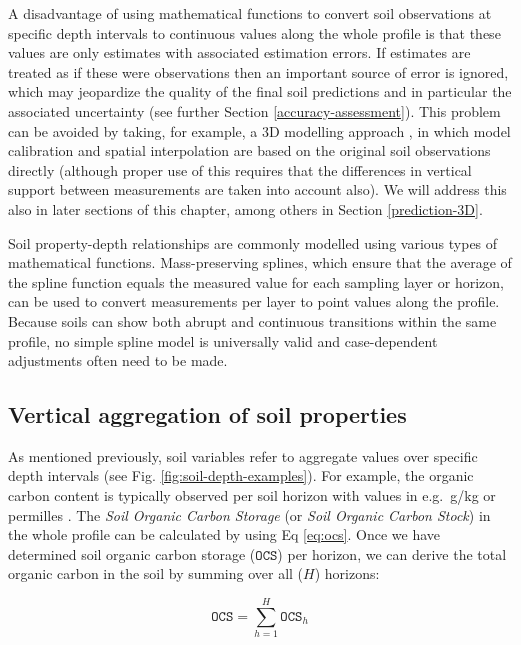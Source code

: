 \documentclass[graybox,natbib,nospthms,UStrade]{svmono}
\let\BeginKnitrBlock\begin \let\EndKnitrBlock\end
\let\BeginKnitrBlock\begin \let\EndKnitrBlock\end
\begin{document}
A disadvantage of using mathematical functions to convert soil
observations at specific depth intervals to continuous values along the
whole profile is that these values are only estimates with associated
estimation errors. If estimates are treated as if these were
observations then an important source of error is ignored, which may
jeopardize the quality of the final soil predictions and in particular
the associated uncertainty (see further
Section \ref{accuracy-assessment}). This problem can be avoided
by taking, for example, a 3D modelling approach
\citep{poggio2014national, Hengl2015AfSoilGrids250m}, in which model
calibration and spatial interpolation are based on the original soil
observations directly (although proper use of this requires that the
differences in vertical support between measurements are taken into
account also). We will address this also in later sections of this
chapter, among others in Section \ref{prediction-3D}.

\BeginKnitrBlock{rmdnote}
Soil property-depth relationships are commonly modelled using various
types of mathematical functions. Mass-preserving splines, which ensure
that the average of the spline function equals the measured value for
each sampling layer or horizon, can be used to convert measurements per
layer to point values along the profile. Because soils can show both
abrupt and continuous transitions within the same profile, no simple
spline model is universally valid and case-dependent adjustments often
need to be made.
\EndKnitrBlock{rmdnote}

\hypertarget{vertical-aggregation}{%
\subsection{Vertical aggregation of soil properties}\label{vertical-aggregation}}

As mentioned previously, soil variables refer to aggregate values over
specific depth intervals (see Fig. \ref{fig:soil-depth-examples}).
For example, the organic carbon content is typically observed per soil
horizon with values in e.g.~g/kg or permilles
\citep{Conant2010, Rainer2010, Panagos2013439}. The \emph{Soil Organic Carbon
Storage} (or \emph{Soil Organic Carbon Stock}) in the whole profile can be
calculated by using Eq \eqref{eq:ocs}. Once we have determined soil
organic carbon storage (\(\mathtt{OCS}\)) per horizon, we can derive the
total organic carbon in the soil by summing over all (\(H\)) horizons:

\begin{equation}
\mathtt{OCS} = \sum\limits_{h = 1}^H { \mathtt{OCS}_h }
\label{eq:ORGCsum}
\end{equation}
\end{document}
